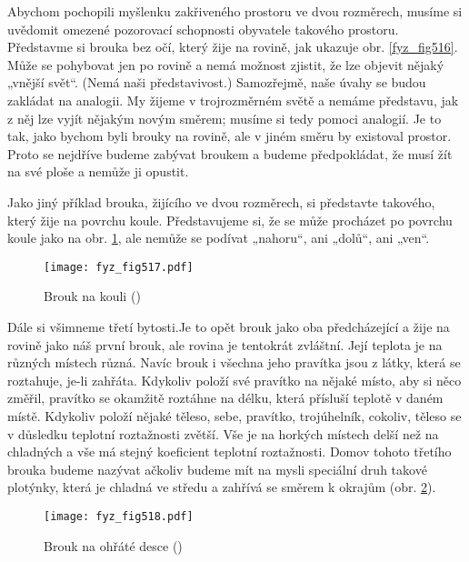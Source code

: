 {    Abychom pochopili myšlenku zakřiveného prostoru ve dvou rozměrech, musíme si uvědomit omezené 
    pozorovací schopnosti obyvatele takového prostoru. Představme si brouka bez očí, který žije na 
    rovině, jak ukazuje obr. \ref{fyz_fig516}. Může se pohybovat jen po rovině a nemá možnost 
    zjistit, že lze objevit nějaký „vnější svět“. (Nemá naši představivost.) Samozřejmě, naše úvahy 
    se budou zakládat na analogii. My žijeme v trojrozměrném světě a nemáme představu, jak z něj 
    lze vyjít nějakým novým směrem; musíme si tedy pomoci analogií. Je to tak, jako bychom byli 
    brouky na rovině, ale v jiném směru by existoval prostor. Proto se nejdříve budeme zabývat 
    broukem a budeme předpokládat, že musí žít na své ploše a nemůže ji opustit.
    
    Jako jiný příklad brouka, žijícího ve dvou rozměrech, si představte takového, který žije na 
    povrchu koule. Představujeme si, že se může procházet po povrchu koule jako na obr. 
    \ref{fyz_fig517}, ale nemůže se podívat „nahoru“, ani „dolů“, ani „ven“.
    
    \begin{figure}[ht!] %
      \centering
      \texttt{[image: fyz\_fig517.pdf]}
      \caption{Brouk na kouli
               (\cite[s.~775]{Feynman02})}
      \label{fyz_fig517}
    \end{figure}
    
    Dále si všimneme třetí bytosti.Je to opět brouk jako oba předcházející a žije na rovině jako 
    náš první brouk, ale rovina je tentokrát zvláštní. Její teplota je na různých místech různá. 
    Navíc brouk i všechna jeho pravítka jsou z látky, která se roztahuje, je-li zahřáta. Kdykoliv 
    položí své pravítko na nějaké místo, aby si něco změřil, pravítko se okamžitě roztáhne na 
    délku, která přísluší teplotě v daném místě. Kdykoliv položí nějaké těleso, sebe, pravítko, 
    trojúhelník, cokoliv, těleso se v důsledku teplotní roztažnosti zvětší. Vše je na horkých 
    místech delší než na chladných a vše má stejný koeficient teplotní roztažnosti. Domov tohoto 
    třetího brouka budeme nazývat  ačkoliv budeme mít na mysli speciální druh 
    takové plotýnky, která je chladná ve středu a zahřívá se směrem k okrajům (obr. 
    \ref{fyz_fig518}).
    
    \begin{figure}[ht!] %
      \centering
      \texttt{[image: fyz\_fig518.pdf]}
      \caption{Brouk na ohřáté desce
               (\cite[s.~776]{Feynman02})}
      \label{fyz_fig518}
    \end{figure}
    
}
